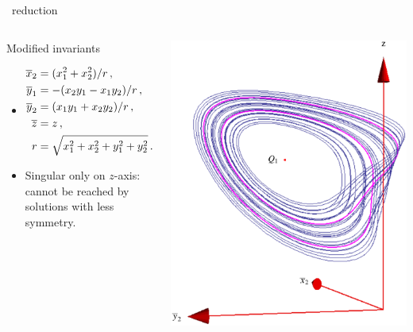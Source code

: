 \documentclass{beamer}
\begin{document}
\begin{frame}{\CLe\ reduction}
 \begin{columns}
  \begin{block}{Modified invariants}
	\begin{itemize}
	 \item \[
			\begin{split}
			\overline{x}_2 &= (x_1^2+x_2^2)/r \,, \\ 
			\overline{y}_1 &= -(x_2 y_1-x_1 y_2)/r\,, \\ 
			\overline{y}_2 &=(x_1 y_1+x_2 y_2)/r\,, \\ 
			\overline{z} &=z\,, \\ 
			r &= \sqrt{x_1^2+x_2^2+y_1^2+y_2^2}
			\,.
			\end{split}
		\]
	\item Singular only on $z$-axis: cannot be reached
		by solutions with less symmetry.
	\end{itemize}
  \end{block}
	  \includegraphics[width=\textwidth]{../../figs/CLEinvXYZdefense}
 \end{columns}
\end{frame}
\end{document}
